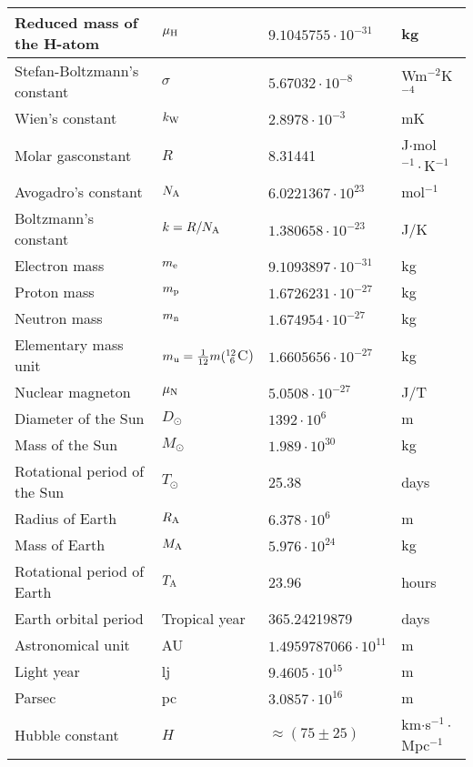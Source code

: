 \begin{center}
\begin{tabular}{||l|lll||}
Reduced mass of the H-atom   &$\mu_{\rm H}$&$9.1045755\cdot10^{-31}$&kg\\
\hline
Stefan-Boltzmann's constant  &$\sigma$&$5.67032\cdot10^{-8}$&Wm$^{-2}$K$^{-4}$\rule{0pt}{13pt}\\
Wien's constant              &$k_{\rm W}$&$2.8978\cdot10^{-3}$&mK\\
\hline
Molar gasconstant            &$R$&8.31441&J$\cdot$mol$^{-1}\cdot$K$^{-1}$\\
Avogadro's constant          &$N_{\rm A}$&$6.0221367\cdot10^{23}$&mol$^{-1}$\\
Boltzmann's constant         &$k=R/N_{\rm A}$&$1.380658\cdot10^{-23}$&J/K\\
\hline
Electron mass                &$m_{\rm e}$&$9.1093897\cdot10^{-31}$&kg\rule{0pt}{13pt}\\
Proton mass                  &$m_{\rm p}$&$1.6726231\cdot10^{-27}$&kg\\
Neutron mass                 &$m_{\rm n}$&$1.674954\cdot10^{-27}$&kg\\
Elementary mass unit         &$m_{\rm u}=\frac{1}{12}m(^{12}_{~6}$C)&$1.6605656\cdot10^{-27}$&kg\\
Nuclear magneton             &$\mu_{\rm N}$&$5.0508\cdot10^{-27}$&J/T\\
\hline
Diameter of the Sun          &$D_\odot$&$1392\cdot10^6$&m\rule{0pt}{13pt}\\
Mass of the Sun              &$M_\odot$&$1.989\cdot10^{30}$&kg\\
Rotational period of the Sun &$T_\odot$&25.38&days\\
Radius of Earth              &$R_{\rm A}$&$6.378\cdot10^6$&m\\
Mass of Earth                &$M_{\rm A}$&$5.976\cdot10^{24}$&kg\\
Rotational period of Earth   &$T_{\rm A}$&23.96&hours\\
Earth orbital period         &Tropical year&365.24219879&days\\
Astronomical unit            &AU&$1.4959787066\cdot10^{11}$&m\\
Light year                   &lj&$9.4605\cdot10^{15}$&m\\
Parsec                       &pc&$3.0857\cdot10^{16}$&m\\
Hubble constant              &$H$&$\approx(75\pm25)$&km$\cdot$s$^{-1}\cdot$Mpc$^{-1}$\\
\hline
\end{tabular}
\end{center}

